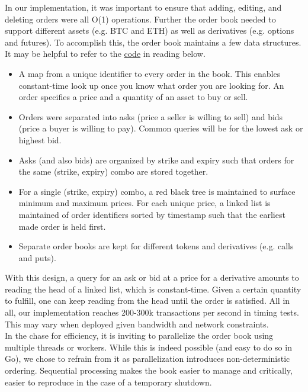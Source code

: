 \documentclass{article}
\begin{document}
\noindent In our implementation, it was important to ensure that adding, editing, and deleting orders were all O(1) operations. Further the order book needed to support different assets (e.g. BTC and ETH) as well as derivatives (e.g. options and futures). To accomplish this, the order book maintains a few data structures. It may be helpful to refer to the \href{https://github.com/pareto-xyz/pareto-orderbook-v1/tree/main/orderbook}{code} in reading below.
\begin{itemize}
    \item A map from a unique identifier to every order in the book. This enables constant-time look up once you know what order you are looking for. An order specifies a price and a quantity of an asset to buy or sell. 
    \item Orders were separated into asks (price a seller is willing to sell) and bids (price a buyer is willing to pay). Common queries will be for the lowest ask or highest bid.
    \item Asks (and also bids) are organized by strike and expiry such that orders for the same (strike, expiry) combo are stored together. 
    \item For a single (strike, expiry) combo, a red black tree is maintained to surface minimum and maximum prices. For each unique price, a linked list is maintained of order identifiers sorted by timestamp such that the earliest made order is held first.
    \item Separate order books are kept for different tokens and derivatives (e.g. calls and puts). 
\end{itemize}

\noindent With this design, a query for an ask or bid at a price for a derivative amounts to reading the head of a linked list, which is constant-time. Given a certain quantity to fulfill, one can keep reading from the head until the order is satisfied. All in all, our implementation reaches 200-300k transactions per second in timing tests. This may vary when deployed given bandwidth and network constraints. \\

\noindent In the chase for efficiency, it is inviting to parallelize the order book using multiple threads or workers. While this is indeed possible (and easy to do so in Go), we chose to refrain from it as parallelization introduces non-deterministic ordering. Sequential processing makes the book easier to manage and critically, easier to reproduce in the case of a temporary shutdown. 
\end{document}

